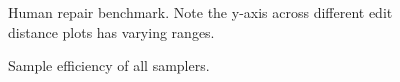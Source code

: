 \documentclass[11pt]{article}
\begin{document}
  \begin{figure}
    \resizebox{.24\textwidth}{!}{}
    \resizebox{.24\textwidth}{!}{}
    \resizebox{.24\textwidth}{!}{}
    \resizebox{.24\textwidth}{!}{}
    \caption{Human repair benchmark. Note the y-axis across different edit distance plots has varying ranges.}\label{fig:human}
  \end{figure}

  \begin{figure}
    
    \caption{Sample efficiency of all samplers.}\label{fig:sample_efficiency}
  \end{figure}
\end{document}

